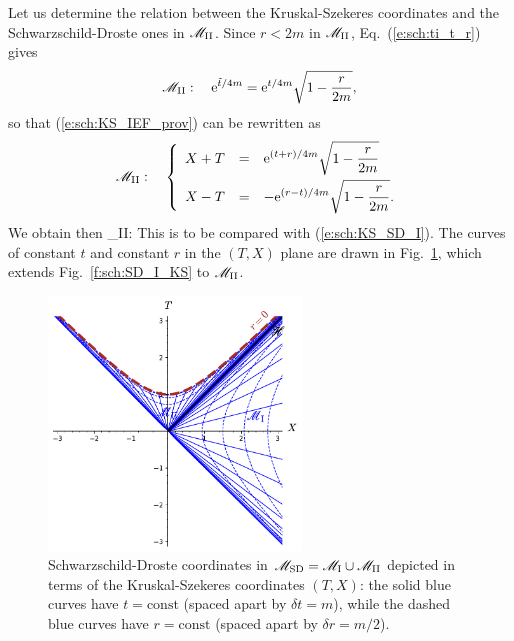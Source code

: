 Let us determine the relation between the Kruskal-Szekeres coordinates and
the Schwarz\-schild-Droste ones in $\mathscr{M}_{\rm II}$. Since $r<2m$ in $\mathscr{M}_{\rm II}$,
Eq.~(\ref{e:sch:ti_t_r}) gives
\[
    \mathscr{M}_{\rm II}: \quad  \mathrm{e}^{{\tilde t}/4m} = \mathrm{e}^{t/4m}  \sqrt{1 -  \frac{r}{2m} } ,
\]
so that (\ref{e:sch:KS_IEF_prov}) can be rewritten as
\[
     \mathscr{M}_{\rm II}: \quad
\left\{\begin{array}{lcl}
    X+T & = & \displaystyle \mathrm{e}^{(t+r)/4m} \sqrt{1 -  \frac{r}{2m} }  \\[2ex]
    X-T & = & \displaystyle  - \mathrm{e}^{(r -t)/4m}  \sqrt{1 -  \frac{r}{2m} }.
    \end{array}\right.
\]
We obtain then
\be \label{e:sch:KS_SD_II}
    \M_{\rm II}: \quad {}
    \iff
\ee
This is to be compared with (\ref{e:sch:KS_SD_I}).
The curves of constant $t$ and constant $r$ in the $(T,X)$ plane
are drawn in Fig.~\ref{f:sch:SD_KS}, which extends Fig.~\ref{f:sch:SD_I_KS}
to $\mathscr{M}_{\rm II}$.

\begin{figure}
\centerline{\includegraphics[width=0.6\textwidth]{max_SD_KS.pdf}}
\caption[]{\label{f:sch:SD_KS} \footnotesize
Schwarzschild-Droste coordinates in $\mathscr{M}_{\rm SD} = \mathscr{M}_{\rm I}\cup \mathscr{M}_{\rm II}$
depicted in terms of the Kruskal-Szekeres coordinates $(T,X)$: the solid blue
curves have $t=\mathrm{const}$ (spaced apart by $\delta t = m$), while the
dashed blue curves have $r=\mathrm{const}$ (spaced apart by $\delta r = m/2$).}
\end{figure}



